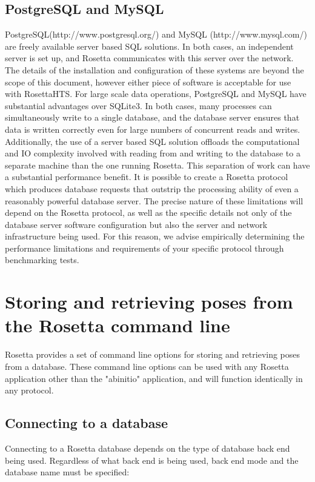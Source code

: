 \subsection{PostgreSQL and MySQL}

PostgreSQL(http://www.postgresql.org/) and MySQL (http://www.mysql.com/) are freely available server based SQL solutions.
In both cases, an independent server is set up, and Rosetta communicates with this server over the network.
The details of the installation and configuration of these systems are beyond the scope of this document, however either piece of software is acceptable for use with RosettaHTS. 
For large scale data operations, PostgreSQL and MySQL have substantial advantages over SQLite3. 
In both cases, many processes can simultaneously write to a single database, and the database server ensures that data is written correctly even for large numbers of concurrent reads and writes.
Additionally, the use of a server based SQL solution offloads the computational and IO complexity involved with reading from and writing to the database to a separate machine than the one running Rosetta.
This separation of work can have a substantial performance benefit.
It is possible to create a Rosetta protocol which produces database requests that outstrip the processing ability of even a reasonably powerful database server.
The precise nature of these limitations will depend on the Rosetta protocol, as well as the specific details not only of the database server software configuration but also the server and network infrastructure being used.
For this reason, we advise empirically determining the performance limitations and requirements of your specific protocol through benchmarking tests.

\section{Storing and retrieving poses from the Rosetta command line}

Rosetta provides a set of command line options for storing and retrieving poses from a database.
These command line options can be used with any Rosetta application other than the "abinitio" application, and will function identically in any protocol.

\subsection{Connecting to a database}

Connecting to a Rosetta database depends on the type of database back end being used.  Regardless of what back end is being used, back end mode and the database name must be specified:

